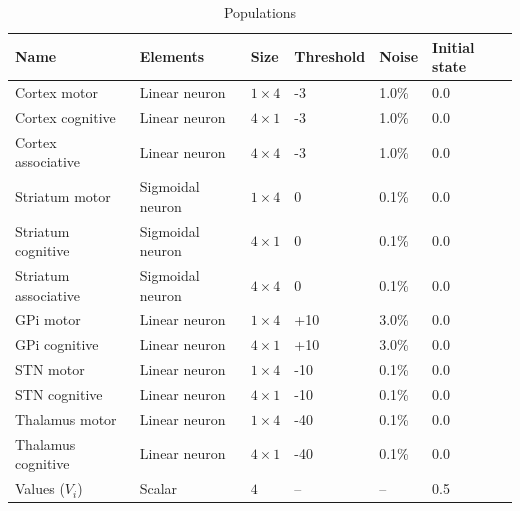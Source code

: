\begin{table}[htbp]
  \small \sffamily \centering
  \begin{tabular}{llllll}
\bf Name & \bf Elements & \bf Size & \bf Threshold & \bf Noise & \bf Initial state\\
\hline
Cortex motor & Linear neuron & \(1 \times 4\) & -3 & 1.0\% & 0.0\\
Cortex cognitive & Linear neuron & \(4 \times 1\) & -3 & 1.0\% & 0.0\\
Cortex associative & Linear neuron & \(4 \times 4\) & -3 & 1.0\% & 0.0\\
Striatum motor & Sigmoidal neuron & \(1 \times 4\) & 0 & 0.1\% & 0.0\\
Striatum cognitive & Sigmoidal neuron & \(4 \times 1\) & 0 & 0.1\% & 0.0\\
Striatum associative & Sigmoidal neuron & \(4 \times 4\) & 0 & 0.1\% & 0.0\\
GPi motor & Linear neuron & \(1 \times 4\) & +10 & 3.0\% & 0.0\\
GPi cognitive & Linear neuron & \(4 \times 1\) & +10 & 3.0\% & 0.0\\
STN motor & Linear neuron & \(1 \times 4\) & -10 & 0.1\% & 0.0\\
STN cognitive & Linear neuron & \(4 \times 1\) & -10 & 0.1\% & 0.0\\
Thalamus motor & Linear neuron & \(1 \times 4\) & -40 & 0.1\% & 0.0\\
Thalamus cognitive & Linear neuron & \(4 \times 1\) & -40 & 0.1\% & 0.0\\
Values (\(V_i\)) & Scalar & \(4\) & -- & -- & 0.5\\
\hline
\end{tabular}
\caption{Populations}
\end{table}

